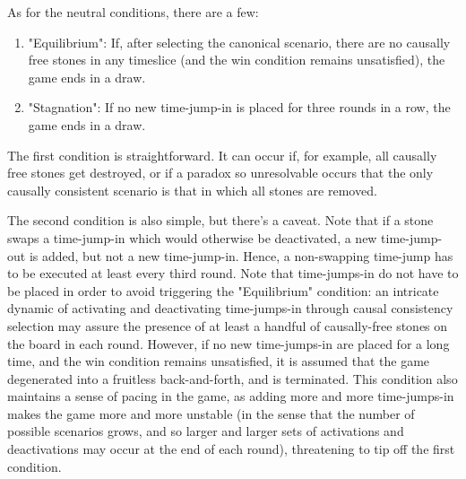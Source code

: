 \documentclass[12pt]{article}
\begin{document}
	As for the neutral conditions, there are a few:
	\begin{enumerate}
		\item "Equilibrium": If, after selecting the canonical scenario, there are no causally free stones in any timeslice (and the win condition remains unsatisfied), the game ends in a draw.
		\item "Stagnation": If no new time-jump-in is placed for three rounds in a row, the game ends in a draw.
	\end{enumerate}
	
	The first condition is straightforward. It can occur if, for example, all causally free stones get destroyed, or if a paradox so unresolvable occurs that the only causally consistent scenario is that in which all stones are removed.

The second condition is also simple, but there's a caveat. Note that if a stone swaps a time-jump-in which would otherwise be deactivated, a new time-jump-out is added, but not a new time-jump-in. Hence, a non-swapping time-jump has to be executed at least every third round. Note that time-jumps-in do not have to be placed in order to avoid triggering the "Equilibrium" condition: an intricate dynamic of activating and deactivating time-jumps-in through causal consistency selection may assure the presence of at least a handful of causally-free stones on the board in each round. However, if no new time-jumps-in are placed for a long time, and the win condition remains unsatisfied, it is assumed that the game degenerated into a fruitless back-and-forth, and is terminated. This condition also maintains a sense of pacing in the game, as adding more and more time-jumps-in makes the game more and more unstable (in the sense that the number of possible scenarios grows, and so larger and larger sets of activations and deactivations may occur at the end of each round), threatening to tip off the first condition.
	
	
\end{document}
